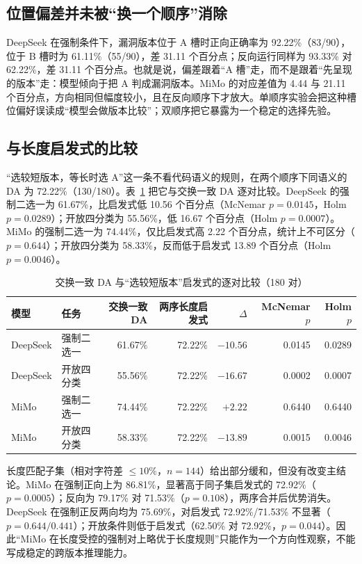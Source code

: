 \documentclass[conference]{IEEEtran}
\begin{document}
\subsection{位置偏差并未被“换一个顺序”消除}

DeepSeek 在强制条件下，漏洞版本位于 A 槽时正向正确率为 92.22\%（83/90），位于 B 槽时为 61.11\%（55/90），差 31.11 个百分点；反向运行同样为 93.33\% 对 62.22\%，差 31.11 个百分点。也就是说，偏差跟着“A 槽”走，而不是跟着“先呈现的版本”走：模型倾向于把 A 判成漏洞版本。MiMo 的对应差值为 4.44 与 21.11 个百分点，方向相同但幅度较小，且在反向顺序下才放大。单顺序实验会把这种槽位偏好误读成“模型会做版本比较”；双顺序把它暴露为一个稳定的选择先验。

\subsection{与长度启发式的比较}

“选较短版本，等长时选 A”这一条不看代码语义的规则，在两个顺序下同语义的 DA 为 72.22\%（130/180）。表~\ref{tab:pd-heur} 把它与交换一致 DA 逐对比较。DeepSeek 的强制二选一为 61.67\%，比启发式低 10.56 个百分点（McNemar $p=0.0145$，Holm $p=0.0289$）；开放四分类为 55.56\%，低 16.67 个百分点（Holm $p=0.0007$）。MiMo 的强制二选一为 74.44\%，仅比启发式高 2.22 个百分点，统计上不可区分（$p=0.644$）；开放四分类为 58.33\%，反而低于启发式 13.89 个百分点（Holm $p=0.0046$）。

\begin{table}[t]
\caption{交换一致 DA 与“选较短版本”启发式的逐对比较（180 对）}
\label{tab:pd-heur}
\centering
\scriptsize
\setlength{\tabcolsep}{3.5pt}
\begin{tabular}{@{}llrrrrr@{}}
\toprule
模型 & 任务 & 交换一致 DA & 两序长度启发式 & $\Delta$ & McNemar $p$ & Holm $p$\\
\midrule
DeepSeek & 强制二选一 & 61.67\% & 72.22\% & $-10.56$ & 0.0145 & 0.0289\\
DeepSeek & 开放四分类 & 55.56\% & 72.22\% & $-16.67$ & 0.0002 & 0.0007\\
MiMo & 强制二选一 & 74.44\% & 72.22\% & $+2.22$ & 0.6440 & 0.6440\\
MiMo & 开放四分类 & 58.33\% & 72.22\% & $-13.89$ & 0.0015 & 0.0046\\
\bottomrule
\end{tabular}
\end{table}

长度匹配子集（相对字符差 $\le 10\%$，$n=144$）给出部分缓和，但没有改变主结论。MiMo 在强制正向上为 86.81\%，显著高于同子集启发式的 72.92\%（$p=0.0005$）；反向为 79.17\% 对 71.53\%（$p=0.108$），两序合并后优势消失。DeepSeek 在强制正反两向均为 75.69\%，对启发式 72.92\%/71.53\% 不显著（$p=0.644/0.441$）；开放条件则低于启发式（62.50\% 对 72.92\%，$p=0.044$）。因此“MiMo 在长度受控的强制对上略优于长度规则”只能作为一个方向性观察，不能写成稳定的跨版本推理能力。
\end{document}
